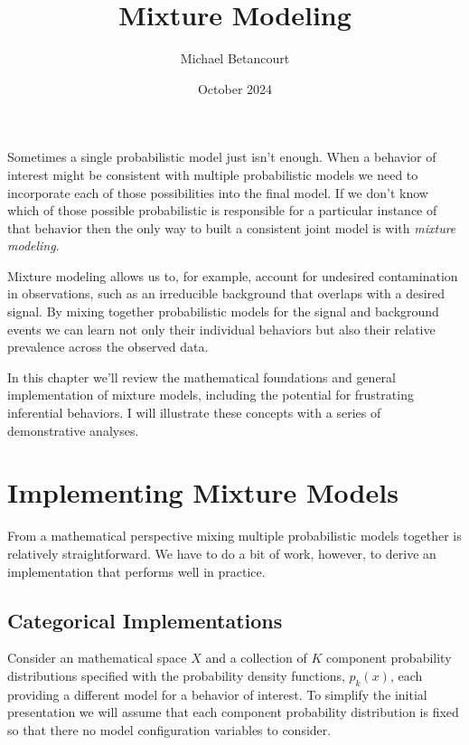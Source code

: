 \documentclass[
  letterpaper,
  DIV=11,
  numbers=noendperiod]{scrartcl}
\title{Mixture Modeling}
\author{Michael Betancourt}
\date{October 2024}
\renewcommand*\contentsname{Table of contents}
\newcommand\contentsname{Table of contents}
\begin{document}
\maketitle

\renewcommand*\contentsname{Table of contents}
{
\hypersetup{linkcolor=}
\setcounter{tocdepth}{3}
\tableofcontents
}
\newcommand{\lpdf}[1]{\log \circ \, #1 }

Sometimes a single probabilistic model just isn't enough. When a
behavior of interest might be consistent with multiple probabilistic
models we need to incorporate each of those possibilities into the final
model. If we don't know which of those possible probabilistic is
responsible for a particular instance of that behavior then the only way
to built a consistent joint model is with \emph{mixture modeling}.

Mixture modeling allows us to, for example, account for undesired
contamination in observations, such as an irreducible background that
overlaps with a desired signal. By mixing together probabilistic models
for the signal and background events we can learn not only their
individual behaviors but also their relative prevalence across the
observed data.

In this chapter we'll review the mathematical foundations and general
implementation of mixture models, including the potential for
frustrating inferential behaviors. I will illustrate these concepts with
a series of demonstrative analyses.

\section{Implementing Mixture Models}\label{implementing-mixture-models}

From a mathematical perspective mixing multiple probabilistic models
together is relatively straightforward. We have to do a bit of work,
however, to derive an implementation that performs well in practice.

\subsection{Categorical Implementations}\label{sec:cat_impl}

Consider an mathematical space \(X\) and a collection of \(K\) component
probability distributions specified with the probability density
functions, \(p_{k}(x)\), each providing a different model for a behavior
of interest. To simplify the initial presentation we will assume that
each component probability distribution is fixed so that there no model
configuration variables to consider.
\end{document}

